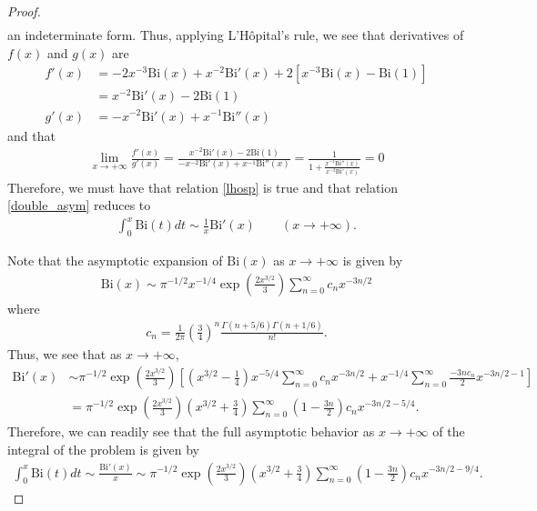 \documentclass[12pt]{article}
\theoremstyle{definition}
\newcommand{\bairy}{\text{Bi}}
\begin{document}
\begin{proof}
\begin{align*}
  \end{align*}
  an indeterminate form. Thus, applying L\rq H\^opital's rule, we see that derivatives of $f(x)$ and $g(x)$ are
  \begin{align*}
    f'(x) &= -2x^{-3}\bairy(x) + x^{-2}\bairy'(x) + 2\left[x^{-3}\bairy(x) - \bairy(1) \right] \\
    &= x^{-2}\bairy'(x) - 2 \bairy(1) \\
    g'(x) &= -x^{-2}\bairy'(x) + x^{-1}\bairy''(x)
  \end{align*}
  and that
  \begin{align*}
    \lim_{x\to + \infty}\frac{f'(x)}{g'(x)} =\frac{x^{-2}\bairy'(x) -2\bairy(1)}{-x^{-2}\bairy'(x) + x^{-1}\bairy''(x)} = \frac{1}{1 + \frac{x^{-1}\bairy''(x)}{x^{-2}\bairy'(x)}} = 0
  \end{align*}
  Therefore, we must have that relation \eqref{lhosp} is true and that relation \eqref{double_asym} reduces to
  \begin{align*}
    \int_0^x \bairy(t) dt \sim \frac{1}{x}\bairy'(x) \qquad (x \to +\infty).
  \end{align*}

  Note that the asymptotic expansion of $\bairy(x)$ as $x \to +\infty$ is given by
  \begin{align*}
    \bairy(x) \sim \pi^{-1/2}x^{-1/4} \exp{\left(\frac{2x^{3/2}}{3}\right)} \sum_{n=0}^\infty c_n x^{-3n/2}
  \end{align*}
  where
  \begin{align*}
    c_n = \frac{1}{2\pi}\left(\frac{3}{4}\right)^n \frac{\Gamma(n + 5/6)\Gamma(n + 1/6)}{n!}.
  \end{align*}
  Thus, we see that as $x \to +\infty$,
  \begin{align*}
    \bairy'(x) &\sim \pi^{-1/2}\exp{\left(\frac{2x^{3/2}}{3}\right)}\left[\left(x^{3/2} - \frac{1}{4}\right)x^{-5/4} \sum_{n=0}^{\infty}c_n x^{-3n/2}  + x^{-1/4}\sum_{n=0}^{\infty}\frac{-3n c_n}{2} x^{-3n/2 - 1}\right] \\
    &= \pi^{-1/2}\exp{\left(\frac{2x^{3/2}}{3}\right)}\left(x^{3/2} + \frac{3}{4}\right)\sum_{n=0}^{\infty}\left(1 - \frac{3n}{2}\right)c_n x^{-3n/2-5/4}.
  \end{align*}
  Therefore, we can readily see that the full asymptotic behavior as $x \to +\infty$ of the integral of the problem is given by
  \begin{align*}
    \int_0^x \bairy(t) dt \sim     \frac{\bairy'(x)}{x} \sim \pi^{-1/2}\exp{\left(\frac{2x^{3/2}}{3}\right)}\left(x^{3/2} + \frac{3}{4}\right)\sum_{n=0}^{\infty}\left(1 - \frac{3n}{2}\right)c_n x^{-3n/2-9/4}.
  \end{align*}
\end{proof}
\newpage
\end{document}
